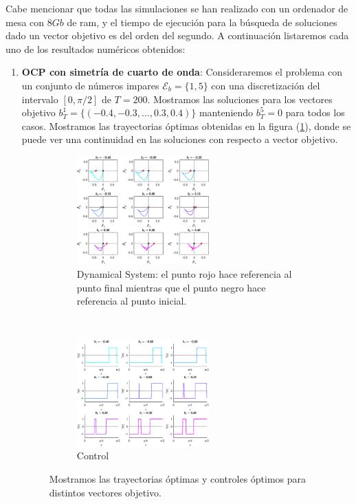 Cabe mencionar que todas las simulaciones se han realizado con un ordenador de mesa con $8Gb$ de ram, y el tiempo de ejecución para la búsqueda de soluciones dado un vector objetivo es del orden del segundo. A continuación listaremos cada uno de los resultados numéricos obtenidos:
\begin{enumerate}    


    \item \textbf{OCP con simetría de cuarto de onda}: Consideraremos el problema  con un conjunto de números impares $\mathcal{E}_b = \{1,5\}$ con una discretización del intervalo $[0,\pi/2]$ de $T = 200$. Mostramos las soluciones para los vectores objetivo $b_T^1 = \{(-0.4,-0.3,\dots,0.3,0.4)\}$ manteniendo $b_T^5=0$ para todos los casos. Mostramos las trayectorias óptimas obtenidas en la figura (\ref{ex01}), donde se puede ver una continuidad en las soluciones con respecto a vector objetivo.

    \begin{figure}
        \centering
        \begin{subfigure}[b]{\textwidth}
            \centering
            \includegraphics[width=0.6\textwidth]{img/ex01-con.eps}
            \caption{Dynamical System: el punto rojo hace referencia al punto final mientras que el punto negro hace referencia al punto inicial.}
        \end{subfigure} 
        \hfill \\
        \begin{subfigure}[b]{\textwidth}
            \centering
            \includegraphics[width=0.6\textwidth]{img/ex01-dyn.eps} 
            \caption{Control}
        \end{subfigure}
        \caption{Mostramos las trayectorias óptimas y controles óptimos para distintos vectores objetivo.}
        \label{ex01}
    \end{figure}



\end{enumerate}
